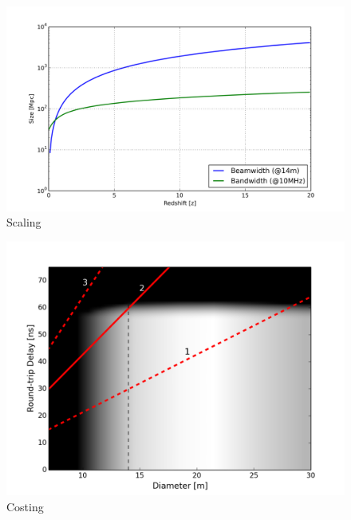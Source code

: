 \documentclass[ars]{copernicus}
\begin{document}
\begin{figure}[t]
\vspace*{2mm}
\begin{center}
\includegraphics[width=\columnwidth]{plots/heraXY.png}
\end{center}
\caption{Scaling  \label{fig:heraXY}}
\end{figure}

\begin{figure}[t]
\vspace*{2mm}
\begin{center}
\includegraphics[width=\columnwidth]{plots/costing.png}
\end{center}
\caption{Costing  \label{fig:costing}}
\end{figure}
\end{document}
